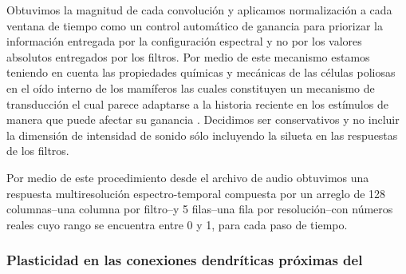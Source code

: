 Obtuvimos la magnitud de cada convolución y aplicamos normalización a cada ventana de tiempo como un control automático de ganancia para priorizar la información entregada por la configuración espectral y no por los valores absolutos entregados por los filtros. Por medio de este mecanismo estamos teniendo en cuenta las propiedades químicas y mecánicas de las células poliosas en el oído interno de los mamíferos las cuales constituyen un mecanismo de transducción el cual parece adaptarse a la historia reciente en los estímulos de manera que puede afectar su ganancia \cite{eatock_2000,holt_2000,le_goff_2005}. Decidimos ser conservativos y no incluir la dimensión de intensidad de sonido sólo incluyendo la silueta en las respuestas de los filtros. 


Por medio de este procedimiento desde el archivo de audio obtuvimos una respuesta multiresolución espectro-temporal compuesta por un arreglo de 128 columnas--una columna por filtro--y 5 filas--una fila por resolución--con números reales cuyo rango se encuentra entre 0 y 1, para cada paso de tiempo.





\subsubsection{Plasticidad en las conexiones dendríticas próximas del }
\label{proximal_dendrites}

